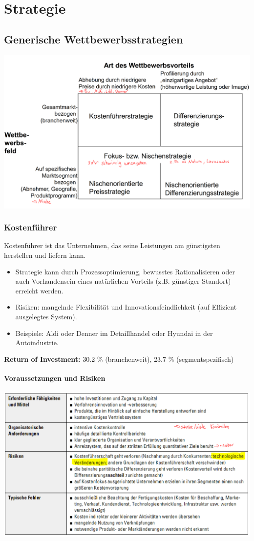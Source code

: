 \section{Strategie}
\subsection{Generische Wettbewerbsstrategien}
\includegraphics[width=0.5\linewidth]{images/wettbewerbsstrategie}

\subsubsection{Kostenführer}
Kostenführer ist das Unternehmen, das seine Leistungen am günstigsten herstellen und liefern kann.
\begin{itemize}
	\item Strategie kann durch Prozessoptimierung, bewusstes Rationalisieren oder auch Vorhandensein eines natürlichen Vorteils (z.B. günstiger Standort) erreicht werden.
	\item Risiken: mangelnde Flexibilität und Innovationsfeindlichkeit (auf Effizient ausgelegtes System).
	\item Beispiele: Aldi oder Denner im Detaillhandel oder Hyundai in der Autoindustrie.
\end{itemize}

\textbf{Return of Investment:} 30.2 \% (branchenweit), 23.7 \% (segmentspezifisch)

\paragraph{Voraussetzungen und Risiken}
\includegraphics[width=0.7\linewidth]{images/risiko_kostenfuehrerschaft}

